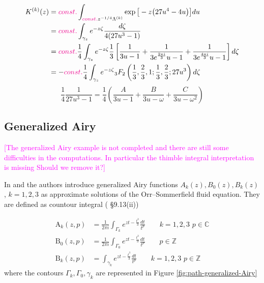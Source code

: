 \documentclass{article}
\theoremstyle{definition}
\newcommand{\Z}{\mathbb{Z}}
\newcommand{\C}{\mathbb{C}}
\begin{document}
\begin{align*}
K^{(k)}(z)&=\textcolor{magenta}{const.} \int_{\textcolor{magenta}{const.}z^{-1/4}\Lambda^{(k)}}\exp\big[- z \big(27 u^4-4 u\big)\big] du\\
&=\textcolor{magenta}{const.} \int_{\gamma_z}e^{-z\zeta} \frac{d\zeta}{4(27u^3-1)}\\
&=\textcolor{magenta}{const.} \frac{1}{4}\int_{\gamma_z}e^{-z\zeta}\frac{1}{3}\left[\frac{1}{3u-1}+\frac{1}{3e^{\frac{2\pi i}{3}} u -1}+\frac{1}{3e^{\frac{4\pi i}{3}} u-1}\right] d\zeta\\
&=-\textcolor{magenta}{const.} \frac{1}{4}\int_{\gamma_z}e^{-z\zeta} {}_3F_2\left(\frac{1}{3},\frac{2}{3},1;\frac{1}{3},\frac{2}{3};27 u^3\right) d\zeta
\end{align*}
\[
\frac{1}{4}\frac{1}{27u^3-1}=\frac{1}{4}(\frac{A}{3u-1}+\frac{B}{3u-\omega}+\frac{C}{3u-\omega^2})
\]



\subsection{Generalized Airy}

\textcolor{magenta}{[The generalized Airy example is not completed and there are still some difficulties in the computations. In particular the thimble integral interpretation is missing Should we remove it?]}

In \cite{Reid} and \cite[Appendix]{drazin-reid} the authors introduce generalized Airy functions $A_k(z), B_0(z), B_k(z)$, $k=1,2,3$ as approximate solutions of the Orr--Sommerfield fluid equation. They are defined as countour integral (\cite{dlmf} \S 9.13(ii))

\begin{align*}
\mathrm{A}_k(z,p)&=\frac{1}{2\pi i}\int_{\Gamma_k}e^{zt-\tfrac{t^3}{3}}\frac{dt}{t^p} \qquad k=1,2,3\,\, p\in\C \\
\mathrm{B}_0(z,p)&=\frac{1}{2\pi i}\int_{\Gamma_0}e^{zt-\tfrac{t^3}{3}}\frac{dt}{t^p} \qquad p\in\Z \\
\mathrm{B}_k(z,p)&=\int_{\gamma_k}e^{zt-\tfrac{t^3}{3}}\frac{dt}{t^p} \qquad k=1,2,3\,\, p\in\Z 
\end{align*}
where the contours $\Gamma_k, \Gamma_0, \gamma_k$ are represented in Figure \ref{fig:path-generalized-Airy} 
\end{document}
